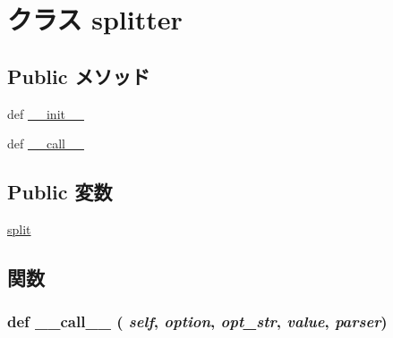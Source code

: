 \hypertarget{classm5_1_1options_1_1splitter}{
\section{クラス splitter}
\label{classm5_1_1options_1_1splitter}
}
\subsection*{Public メソッド}
\begin{DoxyCompactItemize}
\item 
def \hyperlink{classm5_1_1options_1_1splitter_ac775ee34451fdfa742b318538164070e}{\_\-\_\-init\_\-\_\-}
\item 
def \hyperlink{classm5_1_1options_1_1splitter_ae844e0019d38360a86bac1474132db3c}{\_\-\_\-call\_\-\_\-}
\end{DoxyCompactItemize}
\subsection*{Public 変数}
\begin{DoxyCompactItemize}
\item 
\hyperlink{classm5_1_1options_1_1splitter_a67f23769dfcb36d2355c8fa05dbf3b59}{split}
\end{DoxyCompactItemize}


\subsection{関数}
\hypertarget{classm5_1_1options_1_1splitter_ae844e0019d38360a86bac1474132db3c}{
\subsubsection[{\_\-\_\-call\_\-\_\-}]{\setlength{\rightskip}{0pt plus 5cm}def \_\-\_\-call\_\-\_\- ( {\em self}, \/   {\em option}, \/   {\em opt\_\-str}, \/   {\em value}, \/   {\em parser})}}
\label{classm5_1_1options_1_1splitter_ae844e0019d38360a86bac1474132db3c}




